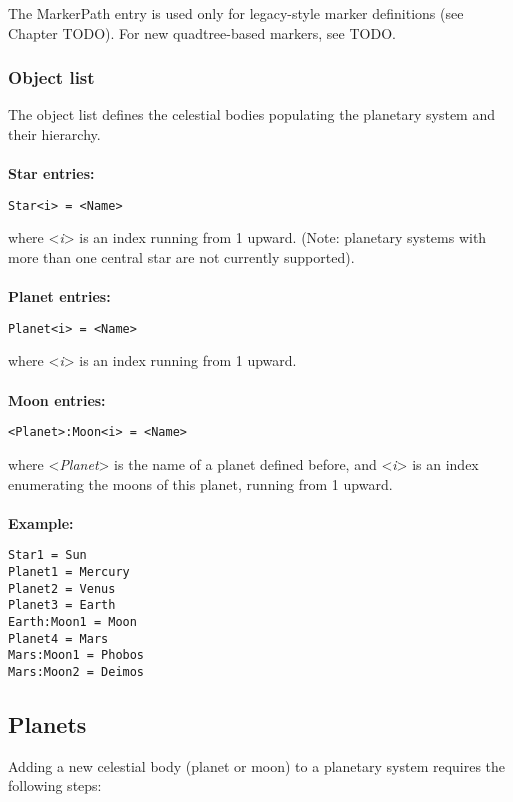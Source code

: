 \documentclass[Orbiter Developer Manual.tex]{subfiles}
\begin{document}
\noindent
The MarkerPath entry is used only for legacy-style marker definitions (see Chapter TODO). For new quadtree-based markers, see TODO.

\subsubsection*{Object list}
The object list defines the celestial bodies populating the planetary system and their hierarchy.\\
\\
\textbf{Star entries:}

\begin{lstlisting}[language=OSFS]
Star<i> = <Name>
\end{lstlisting}

\noindent
where <\textit{i}> is an index running from 1 upward. (Note: planetary systems with more than one central star are not currently supported).\\
\\
\textbf{Planet entries:}

\begin{lstlisting}[language=OSFS]
Planet<i> = <Name>
\end{lstlisting}

\noindent
where <\textit{i}> is an index running from 1 upward.\\
\\
\textbf{Moon entries:}

\begin{lstlisting}[language=OSFS]
<Planet>:Moon<i> = <Name>
\end{lstlisting}

\noindent
where <\textit{Planet}> is the name of a planet defined before, and <\textit{i}> is an index enumerating the moons of this planet, running from 1 upward.\\
\\
\textbf{Example:}

\begin{lstlisting}[language=OSFS]
Star1 = Sun
Planet1 = Mercury
Planet2 = Venus
Planet3 = Earth
Earth:Moon1 = Moon
Planet4 = Mars
Mars:Moon1 = Phobos
Mars:Moon2 = Deimos
\end{lstlisting}


\subsection{Planets}
Adding a new celestial body (planet or moon) to a planetary system requires the following steps:
\end{document}
